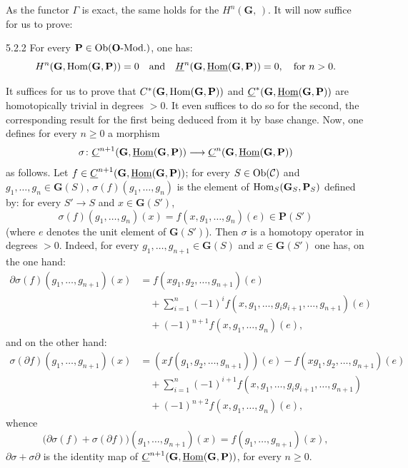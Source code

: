 As the functor \(\Gamma\) is exact, the same holds for the
\(H^{n}(\mathbf{G},\,)\). It will now suffice for us to prove:

\begin{lemma}{5.2.2}
\label{I.5.2.2}
For every \(\mathbf{P}\in\operatorname{Ob}(\mathbf{O}\text{-}\mathrm{Mod.})\), one has:
\[
H^{n}(\mathbf{G},\operatorname{Hom}(\mathbf{G},\mathbf{P}))=0
\quad\text{and}\quad
\underline{H}^{n}(\mathbf{G},\underline{\operatorname{Hom}}(\mathbf{G},\mathbf{P}))=0,
\quad\text{for }n>0.
\]
\end{lemma}

It suffices for us to prove that \(C^{*}(\mathbf{G},\operatorname{Hom}(\mathbf{G},\mathbf{P}))\) and
\(\underline{C}^{*}(\mathbf{G},\underline{\operatorname{Hom}}(\mathbf{G},\mathbf{P}))\) are homotopically
trivial in degrees \(>0\). It even suffices to do so for the second, the
corresponding result for the first being deduced from it by base
change.
Now, one defines for every \(n\geqslant 0\) a morphism
\[
\sigma\colon
\underline{C}^{n+1}(\mathbf{G},\underline{\operatorname{Hom}}(\mathbf{G},\mathbf{P}))
\longrightarrow
\underline{C}^{n}(\mathbf{G},\underline{\operatorname{Hom}}(\mathbf{G},\mathbf{P}))
\]
as follows. Let \(f\in\underline{C}^{n+1}(\mathbf{G},\underline{\operatorname{Hom}}(\mathbf{G},\mathbf{P}))\);
for every \(S\in\operatorname{Ob}(\mathcal{C})\) and \(g_{1},\ldots,g_{n}\in\mathbf{G}(S)\),
\(\sigma(f)(g_{1},\ldots,g_{n})\) is the element of
\(\operatorname{Hom}_{S}(\mathbf{G}_{S},\mathbf{P}_{S})\) defined by: for every \(S'\to S\)
and \(x\in\mathbf{G}(S')\),
\[
\sigma(f)(g_{1},\ldots,g_{n})(x)
=f(x,g_{1},\ldots,g_{n})(e)\in\mathbf{P}(S')
\]
(where \(e\) denotes the unit element of \(\mathbf{G}(S')\)). Then \(\sigma\) is a
homotopy operator in degrees \(>0\). Indeed, for every
\(g_{1},\ldots,g_{n+1}\in\mathbf{G}(S)\) and \(x\in\mathbf{G}(S')\) one has, on
the one hand:
\begin{align*}
\partial\sigma(f)(g_{1},\ldots,g_{n+1})(x)
&=f(xg_{1},g_{2},\ldots,g_{n+1})(e)\\
&\quad+\sum_{i=1}^{n}(-1)^{i}f(x,g_{1},\ldots,g_{i}g_{i+1},\ldots,g_{n+1})(e)
\\
&\quad+(-1)^{n+1}f(x,g_{1},\ldots,g_{n})(e),
\end{align*}
and on the other hand:
\begin{align*}
\sigma(\partial f)(g_{1},\ldots,g_{n+1})(x)
&=(xf(g_{1},g_{2},\ldots,g_{n+1}))(e)
-f(xg_{1},g_{2},\ldots,g_{n+1})(e)\\
&\quad+\sum_{i=1}^{n}(-1)^{i+1}f(x,g_{1},\ldots,g_{i}g_{i+1},\ldots,g_{n+1})
\\
&\quad+(-1)^{n+2}f(x,g_{1},\ldots,g_{n})(e),
\end{align*}
whence
\[
\bigl(\partial\sigma(f)+\sigma(\partial f)\bigr)(g_{1},\ldots,g_{n+1})(x)
=f(g_{1},\ldots,g_{n+1})(x),
\]
\ie \(\partial\sigma+\sigma\partial\) is the identity map of
\(\underline{C}^{n+1}(\mathbf{G},\underline{\operatorname{Hom}}(\mathbf{G},\mathbf{P}))\), for every
\(n\geqslant 0\).


